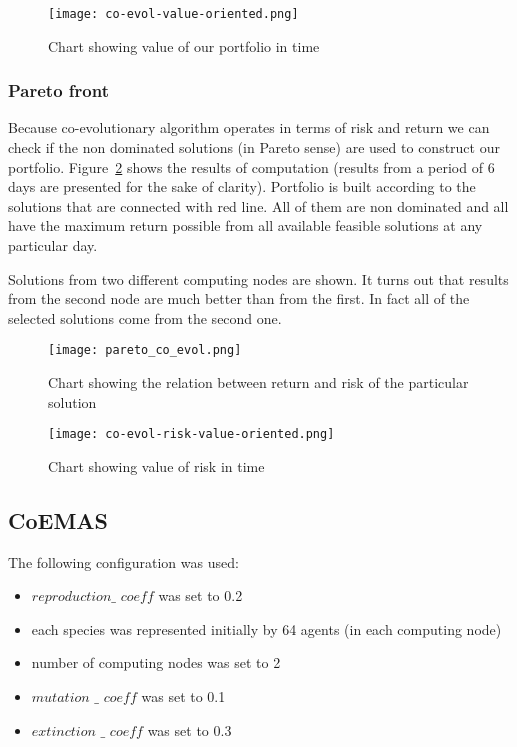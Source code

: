 \begin{figure}[ht]
  \begin{center}
    \texttt{[image: co-evol-value-oriented.png]}
  \end{center}
  \caption{Chart showing value of our portfolio in time}
  \label{fig:co_eval_return}
\end{figure}

\subsubsection{Pareto front}

Because co-evolutionary algorithm operates in terms of risk and return we can check if the non dominated solutions (in Pareto sense) are used to construct our portfolio.
Figure~\ref{fig:pareto_co_evol} shows the results of computation (results from a period of 6 days are presented for the sake of clarity). 
Portfolio is built according to the solutions that are connected with red line.
All of them are non dominated and all have the maximum return possible from all available feasible solutions at any particular day.

Solutions from two different computing nodes are shown.
It turns out that results from the second node are much better than from the first.
In fact all of the selected solutions come from the second one.

\begin{figure}[ht]
  \begin{center}
    \texttt{[image: pareto\_co\_evol.png]}
  \end{center}
  \caption{Chart showing the relation between return and risk of the particular solution}
  \label{fig:pareto_co_evol}
\end{figure}


\begin{figure}[ht]
  \begin{center}
    \texttt{[image: co-evol-risk-value-oriented.png]}
  \end{center}
  \caption{Chart showing value of risk in time}
  \label{fig:co_eval_risk}
\end{figure}

\subsection{CoEMAS}

The following configuration was used:
\begin{itemize}
  \item $reproduction\_$ $coeff$ was set to 0.2
  \item each species was represented initially by 64 agents (in each computing node)
  \item number of computing nodes was set to 2
  \item $mutation$ $\_$ $coeff$ was set to 0.1
  \item $extinction$ $\_$ $coeff$ was set to 0.3
\end{itemize}

